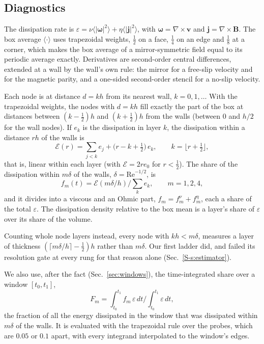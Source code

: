 \documentclass[aip,pop,reprint,amsmath,amssymb,superscriptaddress,floatfix]{revtex4-2}
\newcommand{\Rey}{\mathrm{Re}}
\newcommand{\vv}{\bm{v}}
\newcommand{\BB}{\bm{B}}
\newcommand{\eps}{\varepsilon}
\begin{document}
\subsection{Diagnostics}

The dissipation rate is $\eps=\nu\langle|\bm{\omega}|^2\rangle+\eta\langle|\bm{j}|^2\rangle$,
with $\bm\omega=\nabla\times\vv$ and $\bm{j}=\nabla\times\BB$. The box average
$\langle\cdot\rangle$ uses trapezoidal weights, $\tfrac12$ on a face, $\tfrac14$ on an
edge and $\tfrac18$ at a corner, which makes the box average of a mirror-symmetric
field equal to its periodic average exactly. Derivatives are second-order central
differences, extended at a wall by the wall's own rule: the mirror for a free-slip
velocity and for the magnetic parity, and a one-sided second-order stencil for a
no-slip velocity.

Each node is at distance $d=kh$ from its nearest wall, $k=0,1,\dots$ With the
trapezoidal weights, the nodes with $d=kh$ fill exactly the part of the box at
distances between $(k-\tfrac12)h$ and $(k+\tfrac12)h$ from the walls (between $0$ and
$h/2$ for the wall nodes). If $e_k$ is the dissipation in layer $k$, the dissipation
within a distance $rh$ of the walls is
\begin{equation}
  \mathcal{E}(r) = \sum_{j<k} e_j + \bigl(r-k+\tfrac12\bigr)\, e_k,
  \qquad k=\lfloor r+\tfrac12\rfloor,
  \label{eq:within}
\end{equation}
that is, linear within each layer (with $\mathcal{E}=2re_0$ for $r<\tfrac12$). The
share of the dissipation within $m\delta$ of the walls, $\delta=\Rey^{-1/2}$, is
\begin{equation}
  f_m(t) = \mathcal{E}(m\delta/h) \Big/ \textstyle\sum_k e_k, \qquad m=1,2,4,
  \label{eq:fw}
\end{equation}
and it divides into a viscous and an Ohmic part, $f_m=f_m^{\nu}+f_m^{\eta}$, each a
share of the total $\eps$. The dissipation density relative to the box mean is a
layer's share of $\eps$ over its share of the volume.

Counting whole node layers instead, every node with $kh<m\delta$, measures a layer
of thickness $(\lceil m\delta/h\rceil-\tfrac12)h$ rather than $m\delta$. Our first
ladder did, and failed its resolution gate at every rung for that reason alone
(Sec.~\ref{S-s:estimator}).

We also use, after the fact (Sec.~\ref{sec:windows}), the time-integrated share over
a window $[t_0,t_1]$,
\begin{equation}
  F_m = \int_{t_0}^{t_1} f_m\,\eps\,dt \Big/ \int_{t_0}^{t_1}\eps\,dt ,
  \label{eq:F}
\end{equation}
the fraction of all the energy dissipated in the window that was dissipated within
$m\delta$ of the walls. It is evaluated with the trapezoidal rule over the probes,
which are $0.05$ or $0.1$ apart, with every integrand interpolated to the window's
edges.
\end{document}
